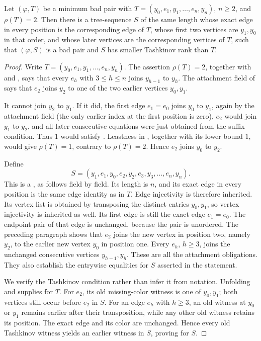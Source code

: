 \begin{helper}
Let \((\varphi,T)\) be a minimum bad pair with
\(T=(y_0,e_1,y_1,\ldots,e_n,y_n)\), \(n\geq2\), and \(\rho(T)=2\).
Then there is a tree-sequence \(S\) of the same length whose exact edge
in every position is the corresponding edge of \(T\), whose first two
vertices are \(y_1,y_0\) in that order, and whose later vertices are the
corresponding vertices of \(T\), such that \((\varphi,S)\) is a bad pair
and \(S\) has smaller Tashkinov rank than \(T\).
\end{helper}
\begin{proof}
Write \(T=(y_0,e_1,y_1,\ldots,e_n,y_n)\).  The assertion
\(\rho(T)=2\), together with  and
, says that every \(e_h\) with
\(3\leq h\leq n\) joins \(y_{h-1}\) to \(y_h\).  The attachment field of
 says that \(e_2\) joins \(y_2\) to one of the two
earlier vertices \(y_0,y_1\).

It cannot join \(y_2\) to \(y_1\).  If it did, the first edge
\(e_1=e_0\) joins \(y_0\) to \(y_1\), again by the attachment field (the
only earlier index at the first position is zero), \(e_2\) would join
\(y_1\) to \(y_2\), and all later consecutive equations were just
obtained from the suffix condition.  Thus \(1\) would satisfy
.  Leastness in
, together with its lower bound \(1\), would
give \(\rho(T)=1\), contrary to \(\rho(T)=2\).  Hence \(e_2\) joins
\(y_0\) to \(y_2\).

Define
\[
 S=(y_1,e_1,y_0,e_2,y_2,e_3,y_3,\ldots,e_n,y_n).
\]
This is a , as follows field by field.  Its length
is \(n\), and its exact edge in every position is the same edge identity
as in \(T\).  Edge injectivity is therefore inherited.  Its vertex list
is obtained by transposing the distinct entries \(y_0,y_1\), so vertex
injectivity is inherited as well.  Its first edge is still the exact
edge \(e_1=e_0\).  The endpoint pair of that edge is unchanged, because
the pair is unordered.  The preceding paragraph shows that \(e_2\)
joins the new vertex in position two, namely \(y_2\), to the earlier
new vertex \(y_0\) in position one.  Every \(e_h\), \(h\geq3\), joins
the unchanged consecutive vertices \(y_{h-1},y_h\).  These are all the
attachment obligations.  They also establish the entrywise equalities
for \(S\) asserted in the statement.

We verify the Tashkinov condition rather than infer it from notation.
Unfolding  and
 supplies  for \(T\).
For \(e_2\), its old missing-color witness is one of \(y_0,y_1\); both
vertices still occur before \(e_2\) in \(S\).  For an edge \(e_h\) with
\(h\geq3\), an old witness at \(y_0\) or \(y_1\) remains earlier after
their transposition, while any other old witness retains its position.
The exact edge and its color are unchanged.  Hence every old Tashkinov
witness yields an earlier witness in \(S\), proving
 for \(S\).


\end{proof}
